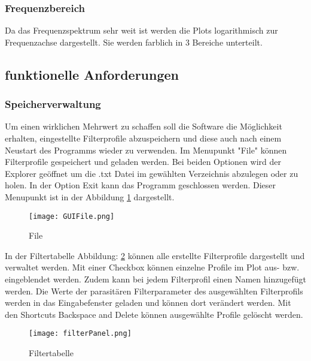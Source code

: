 \subsubsection{Frequenzbereich}\label{subsubsec:frequenzbereich}
Da das Frequenzspektrum sehr weit ist werden die Plots logarithmisch zur Frequenzachse dargestellt. Sie werden farblich in 3 Bereiche unterteilt.
\bigskip
		
\subsection{funktionelle Anforderungen} \label{subsec:funktionelleanforderungen}

\bigskip
\subsubsection{Speicherverwaltung}  \label{subsubsec:speicherverwaltung}
Um einen wirklichen Mehrwert zu schaffen soll die Software die Möglichkeit erhalten, eingestellte Filterprofile abzuspeichern und diese auch nach einem Neustart des Programms wieder zu verwenden. Im Menupunkt "File" können Filterprofile gespeichert und geladen werden. Bei beiden Optionen wird der Explorer geöffnet um die .txt Datei im gewählten Verzeichnis abzulegen oder zu holen. In der Option Exit kann das Programm geschlossen werden. Dieser Menupunkt ist in der Abbildung \ref{fig:GUIFile}  dargestellt.
\begin{figure}[H]
	\centering
	\texttt{[image: GUIFile.png]}
	\caption{File}
	\label{fig:GUIFile}
\end{figure}
In der Filtertabelle Abbildung: \ref{fig:filterPanel} können alle erstellte Filterprofile dargestellt und verwaltet werden.  Mit einer Checkbox können einzelne Profile im Plot aus- bzw. eingeblendet werden. Zudem kann bei jedem Filterprofil einen Namen hinzugefügt werden. Die Werte der parasitären Filterparameter des ausgewählten Filterprofils werden in das Eingabefenster geladen und können dort verändert werden. Mit den Shortcuts Backspace and Delete können ausgewählte Profile gelöscht werden.
\begin{figure}[H]
	\centering
	\texttt{[image: filterPanel.png]}
	\caption{Filtertabelle}
	\label{fig:filterPanel}
\end{figure}
\bigskip

